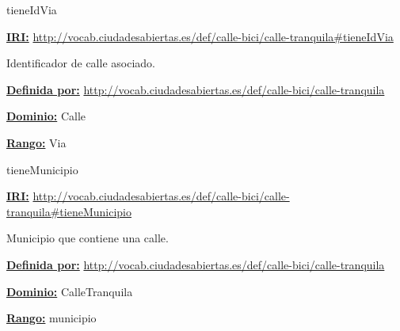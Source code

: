 \begin{mybox}{tieneIdVia}
\begin{flushleft}
\underline{\textbf{IRI:}}
\url{http://vocab.ciudadesabiertas.es/def/calle-bici/calle-tranquila#tieneIdVia}
\newline

Identificador de calle asociado.
\newline

\underline{\textbf{Definida por:}}
\url{http://vocab.ciudadesabiertas.es/def/calle-bici/calle-tranquila}
\newline

\underline{\textbf{Dominio:}}
		Calle
\newline

\underline{\textbf{Rango:}}
		Via
\newline


\end{flushleft}
\end{mybox}





\begin{mybox}{tieneMunicipio}
\begin{flushleft}
\underline{\textbf{IRI:}}
\url{http://vocab.ciudadesabiertas.es/def/calle-bici/calle-tranquila#tieneMunicipio}
\newline

Municipio que contiene una calle.
\newline

\underline{\textbf{Definida por:}}
\url{http://vocab.ciudadesabiertas.es/def/calle-bici/calle-tranquila}
\newline

\underline{\textbf{Dominio:}}
		CalleTranquila
\newline

\underline{\textbf{Rango:}}
		municipio

\end{flushleft}
\end{mybox}








